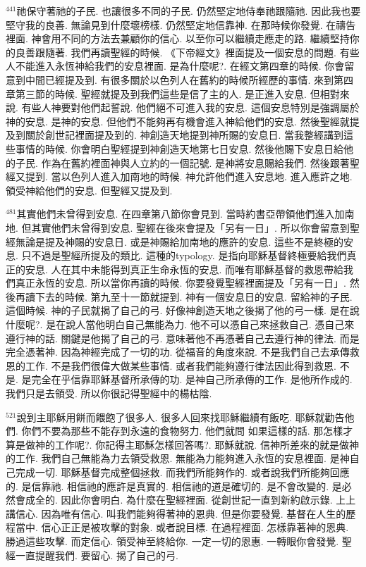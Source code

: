 \documentclass{book}
\begin{document}
$^{441}$祂保守著祂的子民.
也讓很多不同的子民.
仍然堅定地侍奉祂跟隨祂.
因此我也要堅守我的良善.
無論見到什麼壞榜樣.
仍然堅定地信靠神.
在那時候你發覺.
在禱告裡面.
神會用不同的方法去兼顧你的信心.
以至你可以繼續走應走的路.
繼續堅持你的良善跟隨著.
我們再讀聖經的時候.
《下帝經文》裡面提及一個安息的問題.
有些人不能進入永恆神給我們的安息裡面.
是為什麼呢?.
在經文第四章的時候.
你會留意到中間已經提及到.
有很多關於以色列人在舊約的時候所經歷的事情.
來到第四章第三節的時候.
聖經就提及到我們這些是信了主的人.
是正進入安息.
但相對來說.
有些人神要對他們起誓說.
他們絕不可進入我的安息.
這個安息特別是強調屬於神的安息.
是神的安息.
但他們不能夠再有機會進入神給他們的安息.
然後聖經就提及到關於創世記裡面提及到的.
神創造天地提到神所賜的安息日.
當我整經講到這些事情的時候.
你會明白聖經提到神創造天地第七日安息.
然後他賜下安息日給他的子民.
作為在舊約裡面神與人立約的一個記號.
是神將安息賜給我們.
然後跟著聖經又提到.
當以色列人進入加南地的時候.
神允許他們進入安息地.
進入應許之地.
領受神給他們的安息.
但聖經又提及到.

$^{481}$其實他們未曾得到安息.
在四章第八節你會見到.
當時約書亞帶領他們進入加南地.
但其實他們未曾得到安息.
聖經在後來會提及「另有一日」.
所以你會留意到聖經無論是提及神賜的安息日.
或是神賜給加南地的應許的安息.
這些不是終極的安息.
只不過是聖經所提及的類比.
這種的typology.
是指向耶穌基督終極要給我們真正的安息.
人在其中未能得到真正生命永恆的安息.
而唯有耶穌基督的救恩帶給我們真正永恆的安息.
所以當你再讀的時候.
你要發覺聖經裡面提及「另有一日」.
然後再讀下去的時候.
第九至十一節就提到.
神有一個安息日的安息.
留給神的子民.
這個時候.
神的子民就揭了自己的弓.
好像神創造天地之後揭了他的弓一樣.
是在說什麼呢?.
是在說人當他明白自己無能為力.
他不可以憑自己來拯救自己.
憑自己來遵行神的話.
關鍵是他揭了自己的弓.
意味著他不再憑著自己去遵行神的律法.
而是完全憑著神.
因為神經完成了一切的功.
從福音的角度來說.
不是我們自己去承傳救恩的工作.
不是我們很偉大做某些事情.
或者我們能夠遵行律法因此得到救恩.
不是.
是完全在乎信靠耶穌基督所承傳的功.
是神自己所承傳的工作.
是他所作成的.
我們只是去領受.
所以你很記得聖經中的楊枯陰.

$^{521}$說到主耶穌用餅而餵飽了很多人.
很多人回來找耶穌繼續有飯吃.
耶穌就勸告他們.
你們不要為那些不能存到永遠的食物努力.
他們就問 如果這樣的話.
那怎樣才算是做神的工作呢?.
你記得主耶穌怎樣回答嗎?.
耶穌就說.
信神所差來的就是做神的工作.
我們自己無能為力去領受救恩.
無能為力能夠進入永恆的安息裡面.
是神自己完成一切.
耶穌基督完成整個拯救.
而我們所能夠作的.
或者說我們所能夠回應的.
是信靠祂.
相信祂的應許是真實的.
相信祂的道是確切的.
是不會改變的.
是必然會成全的.
因此你會明白.
為什麼在聖經裡面.
從創世記一直到新約啟示錄.
上上講信心.
因為唯有信心.
叫我們能夠得著神的恩典.
但是你要發覺.
基督在人生的歷程當中.
信心正正是被攻擊的對象.
或者說目標.
在過程裡面.
怎樣靠著神的恩典.
勝過這些攻擊.
而定信心.
領受神至終給你.
一定一切的恩惠.
一轉眼你會發覺.
聖經一直提醒我們.
要留心.
揭了自己的弓.
\end{document}
